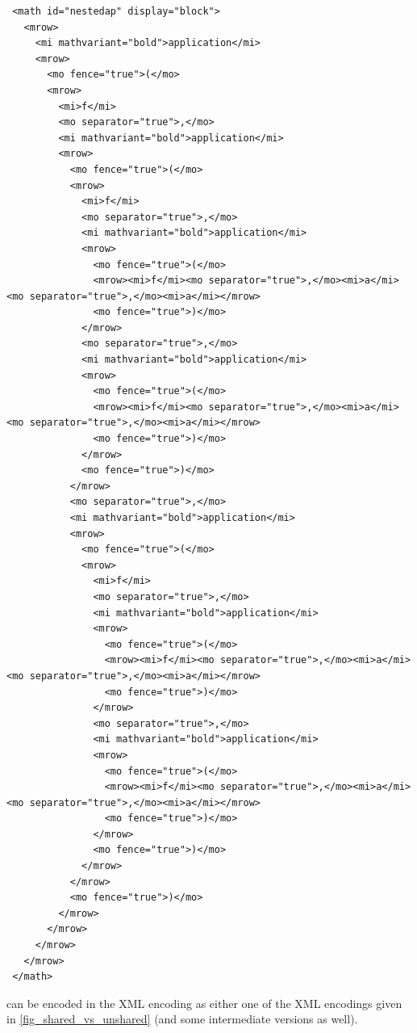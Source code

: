 \documentclass{report}
\def\XML{XML\xspace}
\begin{document}
\begin{description}
\begin{lstlisting}
 <math id="nestedap" display="block">
   <mrow>
     <mi mathvariant="bold">application</mi>
     <mrow>
       <mo fence="true">(</mo>
       <mrow>
         <mi>f</mi>
         <mo separator="true">,</mo>
         <mi mathvariant="bold">application</mi>
         <mrow>
           <mo fence="true">(</mo>
           <mrow>
             <mi>f</mi>
             <mo separator="true">,</mo>
             <mi mathvariant="bold">application</mi>
             <mrow>
               <mo fence="true">(</mo>
               <mrow><mi>f</mi><mo separator="true">,</mo><mi>a</mi><mo separator="true">,</mo><mi>a</mi></mrow>
               <mo fence="true">)</mo>
             </mrow>
             <mo separator="true">,</mo>
             <mi mathvariant="bold">application</mi>
             <mrow>
               <mo fence="true">(</mo>
               <mrow><mi>f</mi><mo separator="true">,</mo><mi>a</mi><mo separator="true">,</mo><mi>a</mi></mrow>
               <mo fence="true">)</mo>
             </mrow>
             <mo fence="true">)</mo>
           </mrow>
           <mo separator="true">,</mo>
           <mi mathvariant="bold">application</mi>
           <mrow>
             <mo fence="true">(</mo>
             <mrow>
               <mi>f</mi>
               <mo separator="true">,</mo>
               <mi mathvariant="bold">application</mi>
               <mrow>
                 <mo fence="true">(</mo>
                 <mrow><mi>f</mi><mo separator="true">,</mo><mi>a</mi><mo separator="true">,</mo><mi>a</mi></mrow>
                 <mo fence="true">)</mo>
               </mrow>
               <mo separator="true">,</mo>
               <mi mathvariant="bold">application</mi>
               <mrow>
                 <mo fence="true">(</mo>
                 <mrow><mi>f</mi><mo separator="true">,</mo><mi>a</mi><mo separator="true">,</mo><mi>a</mi></mrow>
                 <mo fence="true">)</mo>
               </mrow>
               <mo fence="true">)</mo>
             </mrow>
           </mrow>
           <mo fence="true">)</mo>
         </mrow>
       </mrow>
     </mrow>
   </mrow>
 </math>
\end{lstlisting}
can be encoded in the \XML encoding as either one of the \XML encodings given in
\ref{fig_shared_vs_unshared} (and some intermediate versions as well).
\end{description}
\end{document}
